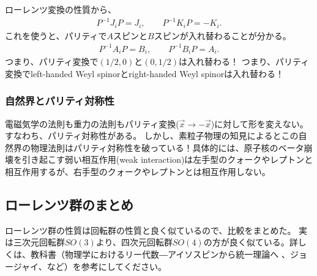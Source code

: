 \documentclass[10pt,a4paper]{jarticle}
\begin{document}
ローレンツ変換の性質から、
\begin{align}
P^{-1} J_i P = J_i, \qquad
P^{-1} K_i P = -K_i.
\end{align}
%
これを使うと、パリティで$A$スピンと$B$スピンが入れ替わることが分かる。
\begin{align}
P^{-1} A_i P = B_i, \qquad
P^{-1} B_i P = A_i.
\end{align}
%
つまり、パリティ変換で$(1/2,0)$と$(0,1/2)$は入れ替わる！
つまり、パリティ変換でleft-handed Weyl spinorとright-handed Weyl spinorは入れ替わる！


\subsubsection{自然界とパリティ対称性}
電磁気学の法則も重力の法則もパリティ変換($\vec x \to - \vec x$)に対して形を変えない。すなわち、パリティ対称性がある。
しかし、素粒子物理の知見によるとこの自然界の物理法則はパリティ対称性を破っている！具体的には、原子核のベータ崩壊を引き起こす弱い相互作用(weak interaction)は左手型のクォークやレプトンと相互作用するが、右手型のクォークやレプトンとは相互作用しない。


\subsection{ローレンツ群のまとめ}
ローレンツ群の性質は回転群の性質と良く似ているので、比較をまとめた。
実は三次元回転群$SO(3)$より、四次元回転群$SO(4)$の方が良く似ている。詳しくは、教科書（物理学におけるリー代数―アイソスピンから統一理論へ 、ジョージャイ、など）を参考にしてください。
\end{document}
